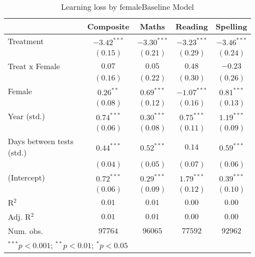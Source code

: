 
\begin{table}
\begin{center}
\begin{tabular}{l c c c c}
\hline
 & Composite & Maths & Reading & Spelling \\
\hline
Treatment                 & $-3.42^{***}$ & $-3.30^{***}$ & $-3.23^{***}$ & $-3.46^{***}$ \\
                          & $(0.15)$      & $(0.21)$      & $(0.29)$      & $(0.24)$      \\
Treat x Female            & $0.07$        & $0.05$        & $0.48$        & $-0.23$       \\
                          & $(0.16)$      & $(0.22)$      & $(0.30)$      & $(0.26)$      \\
Female                    & $0.26^{**}$   & $0.69^{***}$  & $-1.07^{***}$ & $0.81^{***}$  \\
                          & $(0.08)$      & $(0.12)$      & $(0.16)$      & $(0.13)$      \\
Year (std.)               & $0.74^{***}$  & $0.30^{***}$  & $0.75^{***}$  & $1.19^{***}$  \\
                          & $(0.06)$      & $(0.08)$      & $(0.11)$      & $(0.09)$      \\
Days between tests (std.) & $0.44^{***}$  & $0.52^{***}$  & $0.14$        & $0.59^{***}$  \\
                          & $(0.04)$      & $(0.05)$      & $(0.07)$      & $(0.06)$      \\
(Intercept)               & $0.72^{***}$  & $0.29^{***}$  & $1.79^{***}$  & $0.39^{***}$  \\
                          & $(0.06)$      & $(0.09)$      & $(0.12)$      & $(0.10)$      \\
\hline
R$^2$                     & $0.01$        & $0.01$        & $0.00$        & $0.00$        \\
Adj. R$^2$                & $0.01$        & $0.01$        & $0.00$        & $0.00$        \\
Num. obs.                 & $97764$       & $96065$       & $77592$       & $92962$       \\
\hline
\multicolumn{5}{l}{\scriptsize{$^{***}p<0.001$; $^{**}p<0.01$; $^{*}p<0.05$}}
\end{tabular}
\caption{Learning loss by femaleBaseline Model}
\label{tablefemale}
\end{center}
\end{table}
